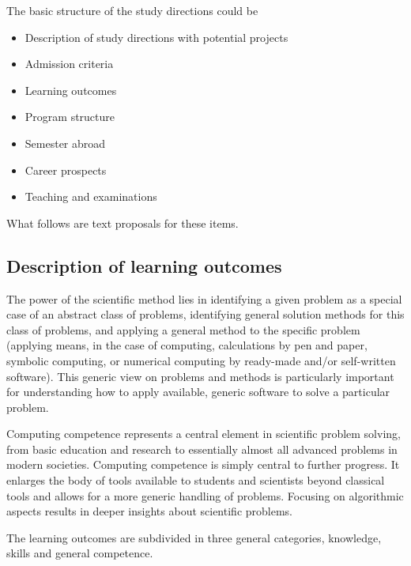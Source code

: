 \documentclass[%
oneside,                 %
final,                   %
10pt]{article}
\begin{document}
The basic structure of the study directions could be

\begin{itemize}
\item Description of study directions with potential projects

\item Admission criteria

\item Learning outcomes

\item Program structure

\item Semester abroad

\item Career prospects

\item Teaching and examinations
\end{itemize}

\noindent
What follows are text proposals for these items.

\subsection*{Description of learning outcomes}

The power of the scientific method lies in identifying a given problem
as a special case of an abstract class of problems, identifying
general solution methods for this class of problems, and applying a
general method to the specific problem (applying means, in the case of
computing, calculations by pen and paper, symbolic computing, or
numerical computing by ready-made and/or self-written software). This
generic view on problems and methods is particularly important for
understanding how to apply available, generic software to solve a
particular problem.

Computing competence represents a central element
in scientific problem solving, from basic education and research to
essentially almost all advanced problems in modern
societies. Computing competence is simply central to further
progress. It enlarges the body of tools available to students and
scientists beyond classical tools and allows for a more generic
handling of problems. Focusing on algorithmic aspects results in
deeper insights about scientific problems.

The learning outcomes are subdivided in three general categories, knowledge, skills and general competence.
\end{document}
